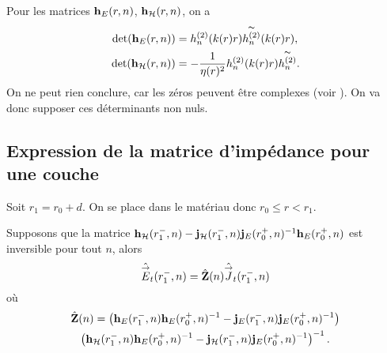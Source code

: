     Pour les matrices \(\mathbf{h}_E(r,n)\), \(\mathbf{h}_{\mathcal{H}}(r,n)\), on a
    \begin{align*}
        \det(\mathbf{h}_E(r,n)) &= h^{(2)}_n(k(r)r)\overset{\thicksim}{h^{(2)}_n}(k(r)r),
        \\
        \det(\mathbf{h}_{\mathcal{H}}(r,n)) &= -\dfrac{1}{\eta(r)^2}h^{(2)}_n(k(r)r)\overset{\thicksim}{h^{(2)}_n}.
     \end{align*}
    On ne peut rien conclure, car les zéros peuvent être complexes (voir \cite{sandstrom_note_2007}). On va donc supposer ces déterminants non nuls.




  \subsection{Expression de la matrice d'impédance pour une couche}

    Soit \(r_1 = r_0 + d\). On se place dans le matériau donc \(r_0 \le r < r_1\).

    \begin{prop}
     Supposons que la matrice \(\mathbf{h}_{\mathcal{H}}(r_1^-,n) - \mathbf{j}_{\mathcal{H}}(r_1^-,n)\mathbf{j}_{E}(r_0^+,n)^{-1}\mathbf{h}_{E}(r_0^+,n)\) est inversible pour tout \(n\), alors
      \begin{equation*}
        \hat {{\overset{\rightarrow}{E}}}_t(r_1^-,n) = \hat {\mathbf{Z}}(n) \hat {{\overset{\rightarrow}{J}}}_t(r_1^-,n)
      \end{equation*}
      où
      \begin{multline*}
        \hat {\mathbf{Z}}(n) =
        \left(\mathbf{h}_{E}(r_1^-,n)\mathbf{h}_{E}(r_0^+,n)^{-1} - \mathbf{j}_{E}(r_1^-,n)\mathbf{j}_{E}(r_0^+,n)^{-1}\right)\\
        \left(\mathbf{h}_{\mathcal{H}}(r_1^-,n)\mathbf{h}_{E}(r_0^+,n)^{-1} - \mathbf{j}_{\mathcal{H}}(r_1^-,n)\mathbf{j}_{E}(r_0^+,n)^{-1}\right)^{-1}.
      \end{multline*}
    \end{prop}

